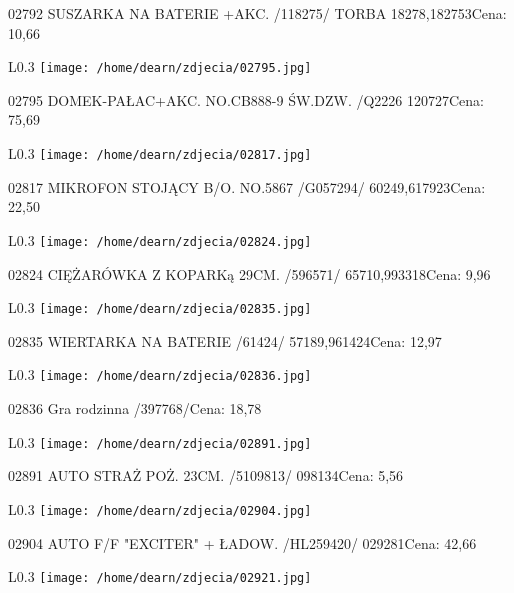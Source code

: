 02792 SUSZARKA NA BATERIE +AKC. /118275/ TORBA  18278,182753Cena: 10,66\newline
\begin{wrapfigure}{L}{0.3\textwidth}
\texttt{[image: /home/dearn/zdjecia/02795.jpg]}
\end{wrapfigure}
02795 DOMEK-PAŁAC+AKC. NO.CB888-9 ŚW.DZW. /Q2226      120727Cena: 75,69\newline
\begin{wrapfigure}{L}{0.3\textwidth}
\texttt{[image: /home/dearn/zdjecia/02817.jpg]}
\end{wrapfigure}
02817 MIKROFON STOJĄCY B/O. NO.5867  /G057294/  60249,617923Cena: 22,50\newline
\begin{wrapfigure}{L}{0.3\textwidth}
\texttt{[image: /home/dearn/zdjecia/02824.jpg]}
\end{wrapfigure}
02824 CIĘŻARÓWKA Z KOPARKą 29CM. /596571/       65710,993318Cena: 9,96\newline
\begin{wrapfigure}{L}{0.3\textwidth}
\texttt{[image: /home/dearn/zdjecia/02835.jpg]}
\end{wrapfigure}
02835 WIERTARKA NA BATERIE /61424/              57189,961424Cena: 12,97\newline
\begin{wrapfigure}{L}{0.3\textwidth}
\texttt{[image: /home/dearn/zdjecia/02836.jpg]}
\end{wrapfigure}
02836 Gra rodzinna /397768/Cena: 18,78\newline
\begin{wrapfigure}{L}{0.3\textwidth}
\texttt{[image: /home/dearn/zdjecia/02891.jpg]}
\end{wrapfigure}
02891 AUTO STRAŻ POŻ. 23CM. /5109813/                 098134Cena: 5,56\newline
\begin{wrapfigure}{L}{0.3\textwidth}
\texttt{[image: /home/dearn/zdjecia/02904.jpg]}
\end{wrapfigure}
02904 AUTO F/F "EXCITER" + ŁADOW. /HL259420/          029281Cena: 42,66\newline
\begin{wrapfigure}{L}{0.3\textwidth}
\texttt{[image: /home/dearn/zdjecia/02921.jpg]}
\end{wrapfigure}
